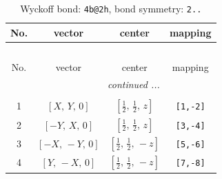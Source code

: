 \documentclass[fleqn,8pt]{jsarticle}
\begin{document}
\renewcommand{\arraystretch}{1.2}
\begin{longtable}{cccc}
\caption{Wyckoff bond: {\tt 4b@2h}, bond symmetry: {\tt 2..}}
 \\
 \hline \hline
No. & vector & center & mapping \\ \hline \endfirsthead

\multicolumn{3}{l}{\tablename\ \thetable{}} \\
 \hline \hline
No. & vector & center & mapping \\ \hline \endhead

 \hline \hline
\multicolumn{3}{r}{\footnotesize\it continued ...} \\ \endfoot

 \hline \hline
\multicolumn{3}{r}{} \\ \endlastfoot

1 & $\left[ X,\, Y,\, 0 \right]$ & $\left[ \frac{1}{2},\, \frac{1}{2},\, z \right]$ & {\tt [1,-2]} \\ \hline
2 & $\left[ - Y,\, X,\, 0 \right]$ & $\left[ \frac{1}{2},\, \frac{1}{2},\, z \right]$ & {\tt [3,-4]} \\ \hline
3 & $\left[ - X,\, - Y,\, 0 \right]$ & $\left[ \frac{1}{2},\, \frac{1}{2},\, - z \right]$ & {\tt [5,-6]} \\ \hline
4 & $\left[ Y,\, - X,\, 0 \right]$ & $\left[ \frac{1}{2},\, \frac{1}{2},\, - z \right]$ & {\tt [7,-8]} \\
\end{longtable}
\renewcommand{\arraystretch}{1.2}
\end{document}
